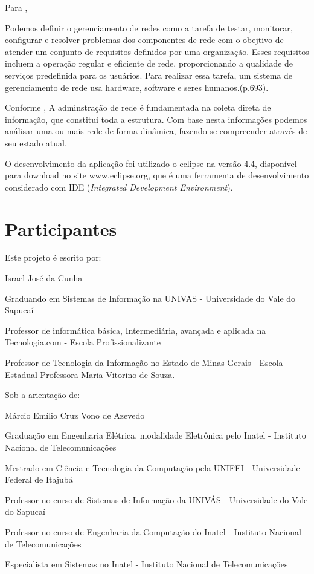 \par Para ,

\begin{citacao}
	Podemos definir o gerenciamento de redes como a tarefa de testar, monitorar,
	configurar e resolver problemas dos componentes de rede com o obejtivo
	de atender um conjunto de requisitos definidos por uma organização. Esses
	requisitos incluem a operação regular e eficiente de rede, proporcionando a
	qualidade de serviços predefinida para os usuários. Para realizar essa tarefa,
	um sistema de gerenciamento de rede usa hardware, software e seres
	humanos.(p.693).
\end{citacao}

\par Conforme , A adminstração de rede é fundamentada na coleta direta de
informação, que constitui toda a estrutura. Com base nesta informações podemos análisar uma
ou mais rede de forma dinâmica, fazendo-se compreender através de seu estado atual.


\par O desenvolvimento da aplicação foi utilizado o eclipse na versão 4.4,
disponível para download no site www.eclipse.org, que é uma ferramenta de
desenvolvimento considerado com IDE (\textit{Integrated Development
Environment}).

\section{Participantes}

\par Este projeto é escrito por:
\par Israel José da Cunha
\par Graduando em Sistemas de Informação na UNIVAS - Universidade do Vale do
Sapucaí 
\par Professor de informática básica, Intermediária, avançada e aplicada na
Tecnologia.com - Escola Profissionalizante
\par Professor de Tecnologia da Informação no Estado de Minas Gerais - Escola
Estadual Professora Maria Vitorino de Souza.


\par Sob a arientação de:
\par Márcio Emílio Cruz Vono de Azevedo
\par Graduação em Engenharia Elétrica, modalidade Eletrônica pelo Inatel -
Instituto Nacional de Telecomunicações
\par Mestrado em Ciência e Tecnologia da Computação pela UNIFEI - Universidade
Federal de Itajubá
\par Professor no curso de Sistemas de Informação da UNIVÁS - Universidade do
Vale do Sapucaí
\par Professor no curso de Engenharia da Computação do Inatel - Instituto
Nacional de Telecomunicações
\par Especialista em Sistemas no Inatel - Instituto Nacional de Telecomunicações


